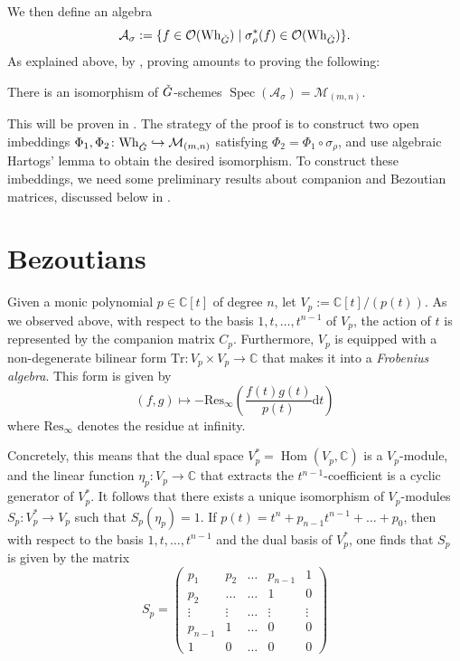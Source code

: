 \documentclass[11pt]{article}
\theoremstyle{definition}
\theoremstyle{plain}
\theoremstyle{remark}
\newcommand{\numberset}{\mathbb}
\newcommand{\C}{\numberset{C}}
\DeclareMathOperator{\Hom}{Hom}
\DeclareMathOperator{\spec}{Spec}
\begin{document}
        We then define an algebra
        \[
            \mathcal{A}_{\sigma} := \{f \in \mathcal{O}(\mathrm{Wh}_{\Check{G}}) \mid \sigma_{\rho}^*(f) \in \mathcal{O}(\mathrm{Wh}_{\Check{G}})\}.
        \]
        As explained above, by \cite[Theorem 3.2.4]{ginzburg2025pointwisepurityderivedsatake}, proving  amounts to proving the following:
        \begin{thm}\label{thm-main2}
            There is an isomorphism of $\Check{G}$-schemes $\spec(\mathcal{A}_{\sigma}) = \mathcal{M}_{(m,n)}$.
        \end{thm}
        This will be proven in . The strategy of the proof is to construct two open imbeddings $\Phi_1,\Phi_2\colon \mathrm{Wh}_{\Check{G}} \hookrightarrow \mathcal{M}_{(m,n)}$ satisfying $\Phi_2 = \Phi_1 \circ \sigma_\rho$, and use algebraic Hartogs' lemma to obtain the desired isomorphism. To construct these imbeddings, we need some preliminary results about companion and Bezoutian matrices, discussed below in .


    \section{Bezoutians}\label{section-bezout}
        
        Given a monic polynomial $p \in \C[t]$ of degree $n$, let $V_p := \C[t]/(p(t))$. As we observed above, with respect to the basis $1,t,\dots,t^{n-1}$ of $V_p$, the action of $t$ is represented by the companion matrix $C_p$. Furthermore, $V_p$ is equipped with a non-degenerate bilinear form $\mathrm{Tr}\colon V_p \times V_p \to \C$ that makes it into a \emph{Frobenius algebra}. This form is given by
        \[
            (f,g) \mapsto -\mathrm{Res}_{\infty}\left(\frac{f(t)g(t)}{p(t)}\mathrm{d}t\right)
        \]
        where $\mathrm{Res}_{\infty}$ denotes the residue at infinity.
        
        Concretely, this means that the dual space $V_p^* = \Hom(V_p,\C)$ is a $V_p$-module, and the linear function $\eta_p\colon V_p \to \C$ that extracts the $t^{n-1}$-coefficient is a cyclic generator of $V_p^*$. It follows that there exists a unique isomorphism of $V_p$-modules $S_p\colon V_p^* \to V_p$ such that $S_p(\eta_p) = 1$. If $p(t) = t^{n} + p_{n-1}t^{n-1} + \dots + p_0$, then with respect to the basis $1,t,\dots,t^{n-1}$ and the dual basis of $V_p^*$, one finds that $S_p$ is given by the matrix
        \begin{equation}\label{eq-Sp-matrix}
            S_p =
            \begin{pmatrix}
                p_1 & p_2 & \dots & p_{n-1} & 1 \\
                p_2 & \dots & \dots & 1 & 0 \\
                \vdots & \vdots & \dots & \vdots & \vdots \\
                p_{n-1} & 1 & \dots & 0 & 0 \\
                1 & 0 & \dots & 0 & 0
            \end{pmatrix}
        \end{equation}
\end{document}
